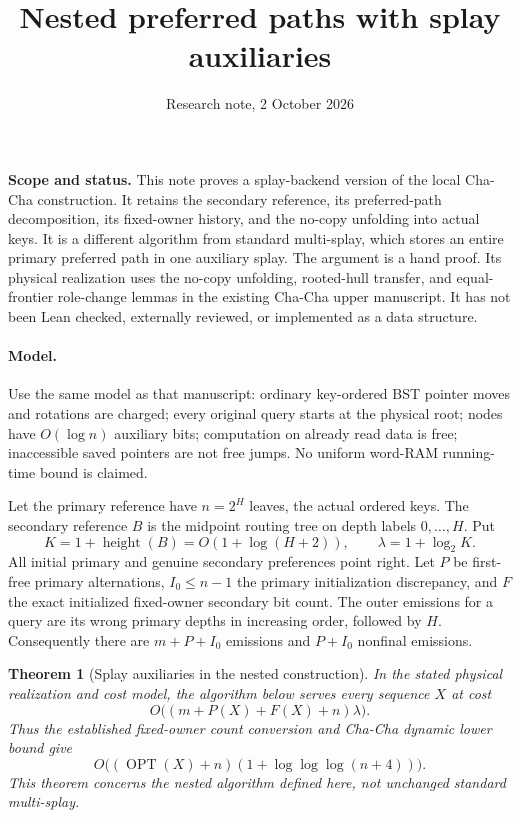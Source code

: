 \documentclass[11pt]{article}
\title{Nested preferred paths with splay auxiliaries}
\author{Research note, 2 October 2026}
\date{}
\newtheorem{theorem}{Theorem}
\newcommand{\OPT}{\operatorname{OPT}}
\begin{document}
\maketitle

\noindent\textbf{Scope and status.}
This note proves a splay-backend version of the local Cha-Cha
construction. It retains the secondary reference, its preferred-path
decomposition, its fixed-owner history, and the no-copy unfolding into
actual keys. It is a different algorithm from standard multi-splay,
which stores an entire primary preferred path in one auxiliary splay.
The argument is a hand proof. Its physical realization uses the
no-copy unfolding, rooted-hull transfer, and equal-frontier role-change
lemmas in the existing Cha-Cha upper manuscript. It has not been
Lean checked, externally reviewed, or implemented as a data structure.

\paragraph{Model.}
Use the same model as that manuscript: ordinary key-ordered BST pointer
moves and rotations are charged; every original query starts at the
physical root; nodes have $O(\log n)$ auxiliary bits; computation on
already read data is free; inaccessible saved pointers are not free
jumps. No uniform word-RAM running-time bound is claimed.

Let the primary reference have $n=2^H$ leaves, the actual ordered keys.
The secondary reference $B$ is the midpoint routing tree on depth labels
$0,\ldots,H$. Put
\[
 K=1+\operatorname{height}(B)=O(1+\log(H+2)),
 \qquad \lambda=1+\log_2 K.
\]
All initial primary and genuine secondary preferences point right.
Let $P$ be first-free primary alternations, $I_0\le n-1$ the primary
initialization discrepancy, and $F$ the exact initialized fixed-owner
secondary bit count. The outer emissions for a query are its wrong
primary depths in increasing order, followed by $H$. Consequently
there are $m+P+I_0$ emissions and $P+I_0$ nonfinal emissions.

\begin{theorem}[Splay auxiliaries in the nested construction]\label{thm:main}
In the stated physical realization and cost model, the algorithm below
serves every sequence $X$ at cost
\[
 O\bigl((m+P(X)+F(X)+n)\lambda\bigr).
\]
Thus the established fixed-owner count conversion and Cha-Cha
dynamic lower bound give
\[
 O\bigl((\OPT(X)+n)(1+\log\log\log(n+4))\bigr).
\]
This theorem concerns the nested algorithm defined here, not unchanged
standard multi-splay.
\end{theorem}
\end{document}
